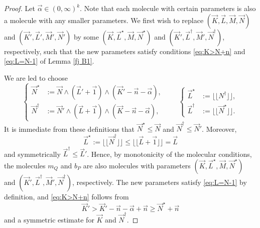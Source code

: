\documentclass[11pt, reqno]{amsart}
\theoremstyle{definition}
\theoremstyle{remark}
\numberwithin{equation}{section}
\newcommand{\vone}{\vec 1}
\newcommand{\vn}{\vec n}
\newcommand{\vN}{\vec N}
\newcommand{\Floor}[1]{\lfloor\!\lfloor #1 \rfloor\!\rfloor}
\begin{document}
\begin{proof}
Let $\vec\alpha\in(0,\infty)^k$. Note that each molecule with certain parameters is also a molecule with any smaller parameters. We first wish to replace $(\vec K,\vec L,\vec M,\vec N)$ and $(\vec K',\vec L',\vec M',\vec N')$ by some
$(\vec K,\vec L^\star,\vec M,\vec N^\star)$ and $(\vec K',\vec L^\dagger,\vec M',\vec N^\dagger)$,
respectively, such that the new parameters satisfy conditions \eqref{eq:K>N+n} and \eqref{eq:L=N-1} of Lemma \ref{fj B1}.

We are led to choose
\begin{equation}\label{eq:newNL}
  \begin{cases} \vec N^\star &:=
  \vec N\wedge(\vec L'+\vone)\wedge(\vec K'-\vn-\vec\alpha),\\
    \vec N^\dagger &:=\vec N'\wedge(\vec L+\vone)\wedge(\vec K-\vn-\vec\alpha),\end{cases}\qquad
   \begin{cases} \vec L^\star &:= \Floor{N^{\dagger}}, \\ \vec L^\dagger &:= \Floor{\vec N^\star}.\end{cases}
\end{equation}
It is immediate from these definitions that $\vec N^\star\leq\vN$ and $\vec N^\dagger\leq\vec N'$. Moreover,
\begin{equation*}
  \vec L^\star:=\Floor{\vec N^\dagger}\leq \Floor{\vec L+\vone}=\vec L
\end{equation*}
and symmetrically $\vec L^\dagger\leq\vec L'$. Hence, by monotonicity of the molecular conditions, the molecules $m_Q$ and $b_P$ are also molecules with parameters $(\vec K,\vec L^\star,\vec M,\vec N^\star)$ and $(\vec K',\vec L^\dagger,\vec M',\vec N^\dagger)$, respectively. The new parameters satisfy \eqref{eq:L=N-1} by definition, and \eqref{eq:K>N+n} follows from
\begin{equation*}
   \vec K'>\vec K'-\vec n-\vec\alpha+\vn\geq \vec N^\star+\vn
\end{equation*}
and a symmetric estimate for $\vec K$ and $\vec N^{\dagger}$.


\end{proof}
\end{document}
